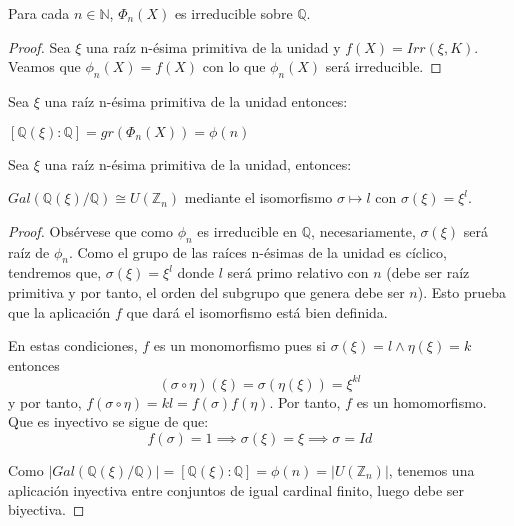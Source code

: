 \begin{proposition}
Para cada $n \in \mathbb{N}$, $\Phi_n(X)$ es irreducible sobre $\mathbb{Q}$.
\end{proposition}
\begin{proof}
Sea $\xi$ una raíz n-ésima primitiva de la unidad y $f(X) = Irr(\xi,K)$. Veamos que $\phi_n(X) = f(X)$ con lo que $\phi_n(X)$ será irreducible. 
\end{proof}

\begin{corollary}
Sea $\xi$ una raíz n-ésima primitiva de la unidad entonces:

$[\mathbb{Q}(\xi):\mathbb{Q}] = gr(\Phi_n(X)) = \phi(n)$
\end{corollary}

\begin{proposition}
Sea $\xi$ una raíz n-ésima primitiva de la unidad, entonces:

$Gal(\mathbb{Q}(\xi)/\mathbb{Q}) \cong U(\mathbb{Z}_n)$ mediante el isomorfismo $\sigma \mapsto l$ con $\sigma(\xi) = \xi^l$. 
\end{proposition}
\begin{proof}
Obsérvese que como $\phi_n$ es irreducible en $\mathbb{Q}$, necesariamente, $\sigma(\xi)$ será raíz de $\phi_n$. Como el grupo de las raíces n-ésimas de la unidad es cíclico, tendremos que, $\sigma(\xi) = \xi^l$ donde $l$ será primo relativo con $n$ (debe ser raíz primitiva y por tanto, el orden del subgrupo que genera debe ser $n$). Esto prueba que la aplicación $f$ que dará el isomorfismo está bien definida. 

En estas condiciones, $f$ es un monomorfismo pues si $\sigma(\xi) = l \land \eta(\xi) = k$ entonces $$(\sigma \circ \eta)(\xi) = \sigma(\eta(\xi)) = \xi^{kl}$$ y por tanto, $f(\sigma \circ \eta) = kl = f(\sigma) f(\eta)$. Por tanto, $f$ es un homomorfismo. Que es inyectivo se sigue de que: $$f(\sigma) = 1 \implies \sigma(\xi) = \xi \implies \sigma = Id$$

Como $|Gal(\mathbb{Q}(\xi)/\mathbb{Q})| = [\mathbb{Q}(\xi):\mathbb{Q}] = \phi(n) = |U(\mathbb{Z}_n)|$, tenemos una aplicación inyectiva entre conjuntos de igual cardinal finito, luego debe ser biyectiva. 
\end{proof}








